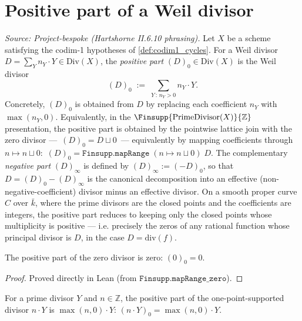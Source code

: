 \section{Positive part of a Weil divisor}
\begin{definition}


  \label{def:WeilDivisor_positivePart}
  \textit{Source: Project-bespoke (Hartshorne II.6.10 phrasing).}
  Let \(X\) be a scheme satisfying the codim-1 hypotheses of
  \ref{def:codim1_cycles}. For a Weil divisor
  \(D = \sum_Y n_Y \cdot Y \in \mathrm{Div}(X)\), the \emph{positive part}
  \((D)_0 \in \mathrm{Div}(X)\) is the Weil divisor
  \[
    (D)_0 \;:=\; \sum_{Y \,:\, n_Y > 0} n_Y \cdot Y.
  \]
  Concretely, \((D)_0\) is obtained from \(D\) by replacing each coefficient
  \(n_Y\) with \(\max(n_Y, 0)\). Equivalently, in the \(\Finsupp{\mathrm{PrimeDivisor}(X)}{\mathbb Z}\)
  presentation, the positive part is obtained by the pointwise lattice
  join with the zero divisor — \(\,(D)_0 = D \sqcup 0\,\) — equivalently
  by mapping coefficients through \(n \mapsto n \sqcup 0\):
  \(\,(D)_0 = \mathtt{Finsupp.mapRange}\;(n \mapsto n \sqcup 0)\;D\). The
  complementary \emph{negative part}
  \((D)_\infty\) is defined by \((D)_\infty := (-D)_0\), so that
  \(D = (D)_0 - (D)_\infty\) is the canonical decomposition into an
  effective (non-negative-coefficient) divisor minus an effective divisor.
  On a smooth proper curve \(C\) over \(\bar k\), where the prime divisors
  are the closed points and the coefficients are integers, the positive part
  reduces to keeping only the closed points whose multiplicity is positive
  — i.e. precisely the zeros of any rational function whose principal
  divisor is \(D\), in the case \(D = \mathrm{div}(f)\).
\end{definition}
\begin{lemma}

  \label{lem:positivePart_zero}
  The positive part of the zero divisor is zero: \((0)_0 = 0\).
\end{lemma}
\begin{proof}
  Proved directly in Lean (from \(\texttt{Finsupp.mapRange\_zero}\)).
\end{proof}
\begin{lemma}

  \label{lem:positivePart_single}
  For a prime divisor \(Y\) and \(n \in \mathbb Z\), the positive part of the
  one-point-supported divisor \(n \cdot Y\) is \(\max(n, 0) \cdot Y\):
  \((n \cdot Y)_0 = \max(n, 0) \cdot Y\).
\end{lemma}
